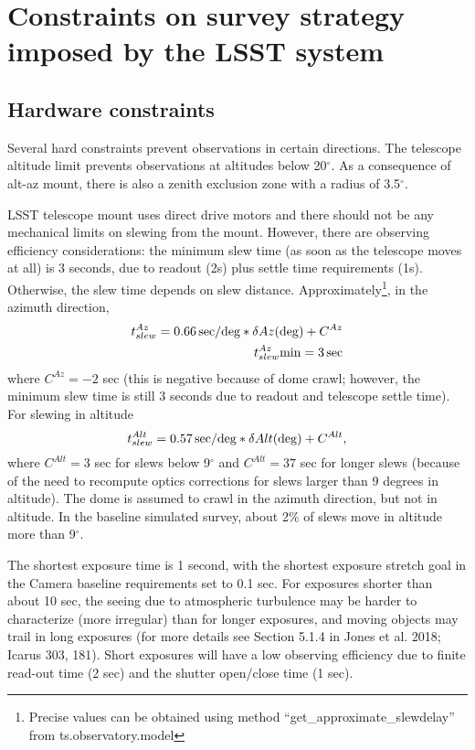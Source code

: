 \documentclass[DM,lsstdraft,toc,usenatbib]{lsstdoc}
\begin{document}
\section{Constraints on survey strategy imposed by the LSST system} 

\subsection{Hardware constraints \label{sec:HW}}

Several hard constraints prevent observations in certain directions. The telescope altitude limit
prevents observations at altitudes below 20$^\circ$.  As a consequence of alt-az mount, there
is also a zenith exclusion zone with a radius of 3.5$^\circ$. 

LSST telescope mount uses direct drive motors and there should not be any mechanical limits 
on slewing from the mount.  However, there are observing efficiency considerations: the minimum
slew time (as soon as the telescope moves at all) is 3 seconds, due to readout (2s) plus settle time requirements (1s). 
Otherwise, the slew time depends on slew distance. Approximately\footnote{Precise values can be obtained using
method ``get\_approximate\_slewdelay'' from ts.observatory.model}, in the azimuth direction, 
\begin{eqnarray}
             t_{slew}^{Az} = 0.66 \, {\rm sec/deg} * \delta Az ({\rm deg}) + C^{Az} \\
             t_{slew}^{Az} {\rm min} = 3\, {\rm sec}
\end{eqnarray} 
where $C^{Az} = -2$ sec (this is negative because of dome crawl; however, the minimum
slew time is still 3 seconds due to readout and telescope settle time). For slewing in altitude
\begin{equation}
             t_{slew}^{Alt} = 0.57 \, {\rm sec/deg} * \delta Alt ({\rm deg}) + C^{Alt} ,  
\end{equation} 
where $C^{Alt} = 3$ sec for slews below 9$^\circ$ and $C^{Alt} = 37$ sec for longer slews (because 
of the need to recompute optics corrections for slews larger than 9 degrees in altitude). 
The dome is assumed to crawl in the azimuth direction, but not in altitude. 
In the baseline simulated survey, about 2\% of slews move
in altitude more than 9$^\circ$. 

The shortest exposure time is 1 second, with the shortest exposure stretch goal in the Camera 
baseline requirements set to 0.1 sec. For exposures shorter than 
about 10 sec, the seeing due to atmospheric turbulence may be harder to characterize (more
irregular) than for longer exposures, and moving objects may trail in long exposures (for more
details see Section 5.1.4 in Jones et al. 2018; Icarus 303, 181). Short exposures will have a low
observing efficiency due to finite read-out time (2 sec) and the shutter open/close time (1 sec). 
\end{document}
